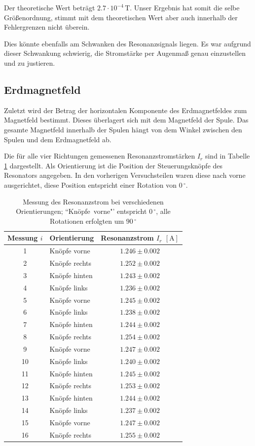 \documentclass[12pt,a4paper]{scrartcl}
\numberwithin{equation}{section} %
\begin{document}
\noindent
Der theoretische Wert beträgt $2.7 \cdot 10^{-4} \mathrm{\, T}$. \cite{Uni} Unser Ergebnis hat somit die selbe Größenordnung, stimmt mit dem theoretischen Wert aber auch innerhalb der Fehlergrenzen nicht überein.

Dies könnte ebenfalls am Schwanken des Resonanzsignals liegen. Es war aufgrund dieser Schwankung schwierig, die Stromstärke per Augenmaß genau einzustellen und zu justieren.

\subsection{Erdmagnetfeld}
Zuletzt wird der Betrag der horizontalen Komponente des Erdmagnetfeldes zum Magnetfeld bestimmt. Dieses überlagert sich mit dem Magnetfeld der Spule. Das gesamte Magnetfeld innerhalb der Spulen hängt von dem Winkel zwischen den Spulen und dem Erdmagnetfeld ab.

Die für alle vier Richtungen gemessenen Resonanzstromstärken $I_r$ sind in Tabelle \ref{table:erdmagnetfeldMessdaten} dargestellt. Als Orientierung ist die Position der Steuerungsknöpfe des Resonators angegeben. In den vorherigen Versuchsteilen waren diese nach vorne ausgerichtet, diese Position entspricht einer Rotation von $0\,^\circ$.

\begin{table}[h!]
	\centering
	\begin{tabular}{c|l|c}
		Messung $i$ & \multicolumn{1}{c|}{Orientierung} & Resonanzstrom $I_r$ $[\mathrm{A}]$ \\
		\hline
		1 & Knöpfe vorne & $1.246 \pm 0.002$ \\
		2 & Knöpfe rechts & $1.252 \pm 0.002$ \\
		3 & Knöpfe hinten & $1.243 \pm 0.002$ \\
		4 & Knöpfe links & $1.236 \pm 0.002$ \\
		5 & Knöpfe vorne & $1.245 \pm 0.002$ \\
		6 & Knöpfe links & $1.238 \pm 0.002$ \\
		7 & Knöpfe hinten & $1.244 \pm 0.002$ \\
		8 & Knöpfe rechts & $1.254 \pm 0.002$ \\
		9 & Knöpfe vorne & $1.247 \pm 0.002$ \\
		10 & Knöpfe links & $1.240 \pm 0.002$ \\
		11 & Knöpfe hinten & $1.245 \pm 0.002$ \\
		12 & Knöpfe rechts & $1.253 \pm 0.002$ \\
		13 & Knöpfe hinten & $1.244 \pm 0.002$ \\
		14 & Knöpfe links & $1.237 \pm 0.002$ \\
		15 & Knöpfe vorne & $1.247 \pm 0.002$ \\
		16 & Knöpfe rechts & $1.255 \pm 0.002$
	\end{tabular}
	\caption{Messung des Resonanzstrom bei verschiedenen Orientierungen;
		``Knöpfe~vorne"' entspricht $0\,^\circ$, alle Rotationen erfolgten um $90\,^\circ$}
	\label{table:erdmagnetfeldMessdaten}
\end{table}
\end{document}
